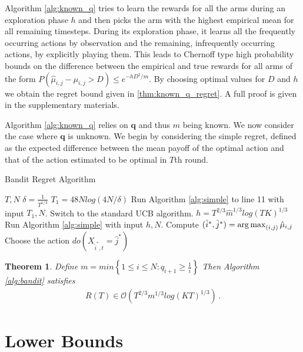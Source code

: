 \documentclass{article}
\newcommand{\set}[1]{\left\{#1\right\}}
\newcommand{\argmax}{\operatornamewithlimits{arg\,max}}
\newcommand{\eq}[1]{\begin{align*}#1\end{align*}}
\newcommand{\bigo}[1]{\mathcal{O}\left( #1 \right)}
\theoremstyle{plain}
\newtheorem{theorem}{Theorem}
\theoremstyle{definition}
\begin{document}
Algorithm \ref{alg:known_q} tries to learn the rewards for all the arms during an exploration phase $h$ and then picks the arm with the highest empirical mean for all remaining timesteps. During its exploration phase, it learns all the frequently occurring actions by observation and the remaining, infrequently occurring actions, by explicitly playing them. This leads to Chernoff type high probability bounds on the difference between the empirical and true rewards for all arms of the form $P(\hat{\mu}_{i,j} - \mu_{i,j} > D) \leq e^{-hD^2/m}$. By choosing optimal values for $D$ and $h$ we obtain the regret bound given in \cref{thm:known_q_regret}. A full proof is given in the supplementary materials. 

Algorithm \ref{alg:known_q} relies on $\boldsymbol{q}$ and thus $m$ being known. We now consider the case where $\boldsymbol{q}$ is unknown. We begin by considering the simple regret, defined as the expected difference between the mean payoff of the optimal action and that of the action estimated to be optimal in $T$th round. 



\begin{algorithm}[h]
\caption{Bandit Regret Algorithm}\label{alg:bandit}
\begin{algorithmic}[1]
 $T, N$
\STATE $\delta = \frac{1}{T^{1/3}}$ 
\STATE $T_1 = 48Nlog\left(4N/\delta\right)$ 
\STATE Run Algorithm \ref{alg:simple} to line 11 with input $T_1,N$.
\STATE Switch to the standard UCB algorithm.
\ELSE
\STATE $h = T^{2/3}\hat{m}^{1/3}log(TK)^{1/3}$ 
\STATE Run Algorithm \ref{alg:simple} with input $h,N$.
\STATE Compute $(\hat{i}^*,\hat{j}^*) = \argmax_{(i,j)} \hat{\mu}_{i,j}$
\STATE Choose the action $do(X_{\hat{i}^*,t} = \hat{j}^*)$
\ENDFOR
\ENDIF
\end{algorithmic}
\end{algorithm}

\begin{theorem}\label{thm:unknown_q_regret}
Define $m =   min\set{1 \leq i \leq N:q_{i+1} \geq \frac{1}{i}}$
Then Algorithm \ref{alg:bandit} satisfies
\eq{
R(T) \in \bigo{T^{2/3}m^{1/3}log(KT)^{1/3}}\,.
}
\end{theorem}


\section{Lower Bounds}
\end{document}
